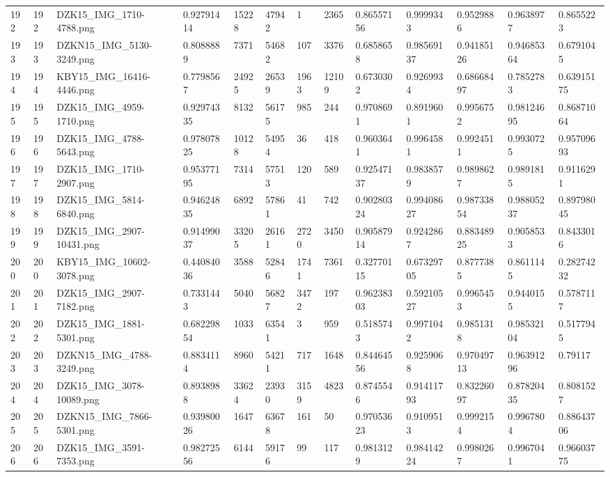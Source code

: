 \documentclass[11pt, a4paper, twoside]{report}
\begin{document}
\begin{longtable}[c]{@{}lllllllllllll@{}}
192 & 192 & DZK15\_IMG\_1710-4788.png & 0.92791414 & 15228 & 47942 & 1 & 2365 & 0.86557156 & 0.9999343 & 0.9529886 & 0.9638977 & 0.8655223 \\
193 & 193 & DZKN15\_IMG\_5130-3249.png & 0.8088889 & 7371 & 54682 & 107 & 3376 & 0.6858658 & 0.98569137 & 0.94185126 & 0.94685364 & 0.6791045 \\
194 & 194 & KBY15\_IMG\_16416-4446.png & 0.7798567 & 24925 & 26539 & 1963 & 12109 & 0.6730302 & 0.9269934 & 0.68668497 & 0.7852783 & 0.63915175 \\
195 & 195 & DZK15\_IMG\_4959-1710.png & 0.92974335 & 8132 & 56175 & 985 & 244 & 0.9708691 & 0.8919601 & 0.9956752 & 0.98124695 & 0.86871064 \\
196 & 196 & DZK15\_IMG\_4788-5643.png & 0.97807825 & 10128 & 54954 & 36 & 418 & 0.9603641 & 0.9964581 & 0.9924511 & 0.9930725 & 0.95709693 \\
197 & 197 & DZK15\_IMG\_1710-2907.png & 0.95377195 & 7314 & 57513 & 120 & 589 & 0.92547137 & 0.9838579 & 0.9898627 & 0.9891815 & 0.9116291 \\
198 & 198 & DZK15\_IMG\_5814-6840.png & 0.94624835 & 6892 & 57861 & 41 & 742 & 0.90280324 & 0.99408627 & 0.98733854 & 0.98805237 & 0.89798045 \\
199 & 199 & DZK15\_IMG\_2907-10431.png & 0.91499037 & 33205 & 26161 & 2720 & 3450 & 0.90587914 & 0.9242867 & 0.88348925 & 0.9058533 & 0.8433016 \\
200 & 200 & KBY15\_IMG\_10602-3078.png & 0.44084036 & 3588 & 52846 & 1741 & 7361 & 0.32770115 & 0.67329705 & 0.8777385 & 0.8611145 & 0.28274232 \\
201 & 201 & DZK15\_IMG\_2907-7182.png & 0.7331443 & 5040 & 56827 & 3472 & 197 & 0.96238303 & 0.59210527 & 0.9965453 & 0.9440155 & 0.5787117 \\
202 & 202 & DZK15\_IMG\_1881-5301.png & 0.68229854 & 1033 & 63541 & 3 & 959 & 0.5185743 & 0.9971042 & 0.9851318 & 0.98532104 & 0.5177945 \\
203 & 203 & DZKN15\_IMG\_4788-3249.png & 0.8834114 & 8960 & 54211 & 717 & 1648 & 0.84464556 & 0.9259068 & 0.97049713 & 0.96391296 & 0.79117 \\
204 & 204 & DZK15\_IMG\_3078-10089.png & 0.8938988 & 33624 & 23930 & 3159 & 4823 & 0.8745546 & 0.91411793 & 0.83226097 & 0.87820435 & 0.8081527 \\
205 & 205 & DZKN15\_IMG\_7866-5301.png & 0.93980026 & 1647 & 63678 & 161 & 50 & 0.97053623 & 0.9109513 & 0.9992154 & 0.9967804 & 0.88643706 \\
206 & 206 & DZK15\_IMG\_3591-7353.png & 0.98272556 & 6144 & 59176 & 99 & 117 & 0.9813129 & 0.98414224 & 0.9980267 & 0.9967041 & 0.96603775 \\

\end{longtable}
\end{document}
